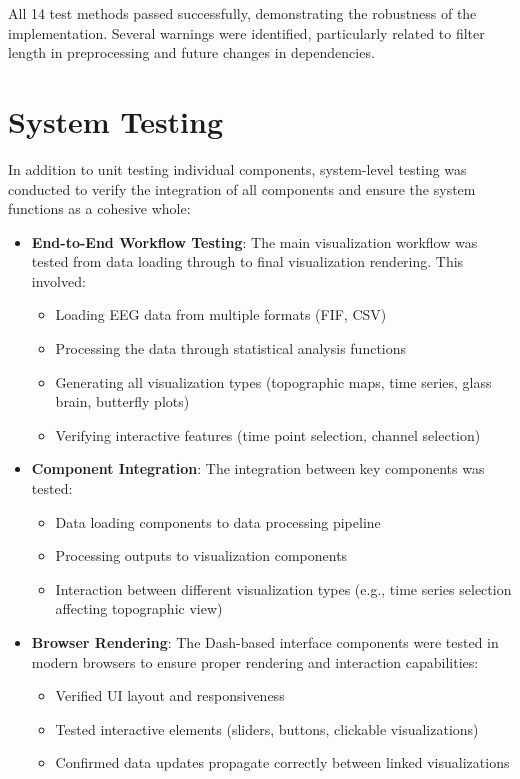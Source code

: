 \documentclass[12pt, titlepage]{article}
\begin{document}
All 14 test methods passed successfully, demonstrating the robustness of the implementation. Several warnings were identified, particularly related to filter length in preprocessing and future changes in dependencies.

\section{System Testing}

In addition to unit testing individual components, system-level testing was conducted to verify the integration of all components and ensure the system functions as a cohesive whole:

\begin{itemize}
    \item \textbf{End-to-End Workflow Testing}: The main visualization workflow was tested from data loading through to final visualization rendering. This involved:
    \begin{itemize}
        \item Loading EEG data from multiple formats (FIF, CSV)
        \item Processing the data through statistical analysis functions
        \item Generating all visualization types (topographic maps, time series, glass brain, butterfly plots)
        \item Verifying interactive features (time point selection, channel selection)
    \end{itemize}
    
    \item \textbf{Component Integration}: The integration between key components was tested:
    \begin{itemize}
        \item Data loading components to data processing pipeline
        \item Processing outputs to visualization components
        \item Interaction between different visualization types (e.g., time series selection affecting topographic view)
    \end{itemize}
    
    \item \textbf{Browser Rendering}: The Dash-based interface components were tested in modern browsers to ensure proper rendering and interaction capabilities:
    \begin{itemize}
        \item Verified UI layout and responsiveness
        \item Tested interactive elements (sliders, buttons, clickable visualizations)
        \item Confirmed data updates propagate correctly between linked visualizations
    \end{itemize}
    

\end{itemize}
\end{document}
